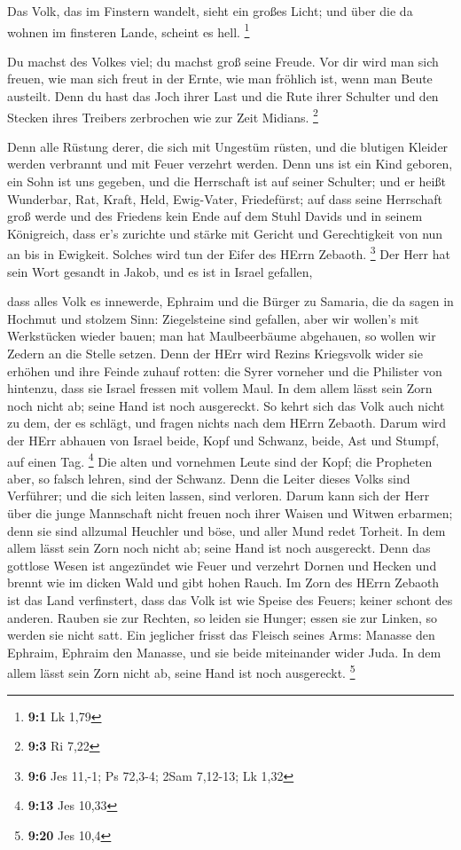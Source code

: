  Das Volk, das im Finstern wandelt, sieht ein großes Licht;
und über die da wohnen im finsteren Lande, scheint es hell. \footnote{\textbf{9:1}
  Lk 1,79}

 Du machst des Volkes viel; du machst groß seine Freude. Vor
dir wird man sich freuen, wie man sich freut in der Ernte, wie man
fröhlich ist, wenn man Beute austeilt.  Denn du hast das
Joch ihrer Last und die Rute ihrer Schulter und den Stecken ihres
Treibers zerbrochen wie zur Zeit Midians. \footnote{\textbf{9:3} Ri 7,22}

 Denn alle Rüstung derer, die sich mit Ungestüm rüsten, und
die blutigen Kleider werden verbrannt und mit Feuer verzehrt werden.
 Denn uns ist ein Kind geboren, ein Sohn ist uns gegeben,
und die Herrschaft ist auf seiner Schulter; und er heißt Wunderbar, Rat,
Kraft, Held, Ewig-Vater, Friedefürst;  auf dass seine
Herrschaft groß werde und des Friedens kein Ende auf dem Stuhl Davids
und in seinem Königreich, dass er's zurichte und stärke mit Gericht und
Gerechtigkeit von nun an bis in Ewigkeit. Solches wird tun der Eifer des
HErrn Zebaoth. \footnote{\textbf{9:6} Jes 11,-1; Ps 72,3-4; 2Sam
  7,12-13; Lk 1,32}  Der Herr hat sein Wort gesandt in
Jakob, und es ist in Israel gefallen,

 dass alles Volk es innewerde, Ephraim und die Bürger zu
Samaria, die da sagen in Hochmut und stolzem Sinn: 
Ziegelsteine sind gefallen, aber wir wollen's mit Werkstücken wieder
bauen; man hat Maulbeerbäume abgehauen, so wollen wir Zedern an die
Stelle setzen.  Denn der HErr wird Rezins Kriegsvolk wider
sie erhöhen und ihre Feinde zuhauf rotten:  die Syrer
vorneher und die Philister von hintenzu, dass sie Israel fressen mit
vollem Maul. In dem allem lässt sein Zorn noch nicht ab; seine Hand ist
noch ausgereckt.  So kehrt sich das Volk auch nicht zu dem,
der es schlägt, und fragen nichts nach dem HErrn Zebaoth. 
Darum wird der HErr abhauen von Israel beide, Kopf und Schwanz, beide,
Ast und Stumpf, auf einen Tag. \footnote{\textbf{9:13} Jes 10,33}
 Die alten und vornehmen Leute sind der Kopf; die Propheten
aber, so falsch lehren, sind der Schwanz.  Denn die Leiter
dieses Volks sind Verführer; und die sich leiten lassen, sind verloren.
 Darum kann sich der Herr über die junge Mannschaft nicht
freuen noch ihrer Waisen und Witwen erbarmen; denn sie sind allzumal
Heuchler und böse, und aller Mund redet Torheit. In dem allem lässt sein
Zorn noch nicht ab; seine Hand ist noch ausgereckt.  Denn
das gottlose Wesen ist angezündet wie Feuer und verzehrt Dornen und
Hecken und brennt wie im dicken Wald und gibt hohen Rauch. 
Im Zorn des HErrn Zebaoth ist das Land verfinstert, dass das Volk ist
wie Speise des Feuers; keiner schont des anderen.  Rauben
sie zur Rechten, so leiden sie Hunger; essen sie zur Linken, so werden
sie nicht satt. Ein jeglicher frisst das Fleisch seines Arms:
 Manasse den Ephraim, Ephraim den Manasse, und sie beide
miteinander wider Juda. In dem allem lässt sein Zorn nicht ab, seine
Hand ist noch ausgereckt. \footnote{\textbf{9:20} Jes 10,4}

